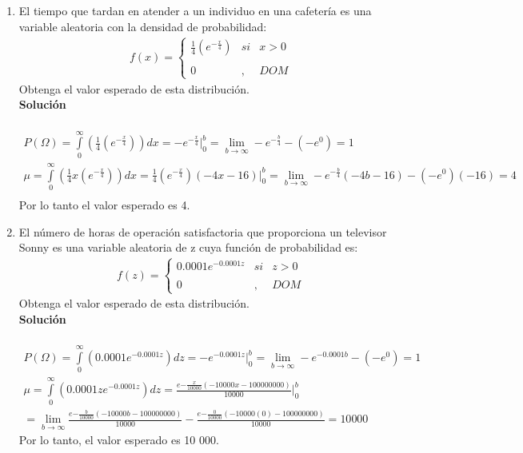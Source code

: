 \begin{enumerate}
    \item El tiempo que tardan en atender a un individuo en una cafetería es una variable aleatoria con la densidad de probabilidad: \\
    \begin{align*}
    f(x)= \left\{ \begin{array}{lcc}
    \frac{1}{4}(e^{-\frac{x}{4}}) &   si  & x > 0 \\
    \\ 0 &  ,  & DOM
    \end{array}
    \right.
    \end{align*}
    Obtenga el valor esperado de esta distribución.
    \\\textbf{Solución}
    \\ \\
    \begin{gather*}
    P(\Omega) = \int \limits_{0}^\infty (\frac{1}{4}(e^{-\frac{x}{4}})) dx = -e^{-\frac{x}{4}} \bigg\vert_{0}^{b} = \lim \limits_{b \rightarrow \infty} -e^{-\frac{b}{4}} - (-e^{0}) = 1 \\
    \mu = \int \limits_{0}^\infty (\frac{1}{4}x(e^{-\frac{x}{4}})) dx = \frac{1}{4}(e^{-\frac{x}{4}})(-4x-16) \bigg\vert_{0}^b = \lim \limits_{b \rightarrow \infty} -e^{-\frac{b}{4}}(-4b -16) - (-e^{0})(-16) = 4 \\
    \end{gather*}
    Por lo tanto el valor esperado es 4. \\
    
    \item El número de horas de operación satisfactoria que proporciona un televisor Sonny es una variable aleatoria de z cuya función de probabilidad es: \\
    \begin{align*}
    f(z)= \left\{ \begin{array}{lcc}
    0.0001e^{-0.0001z} &   si  & z > 0 \\
    \\ 0 &  ,  & DOM
    \end{array}
    \right.
    \end{align*}
    Obtenga el valor esperado de esta distribución.
    \\\textbf{Solución}
    \\ \\
    \begin{gather*}
    P(\Omega) = \int \limits_{0}^{\infty} (0.0001e^{-0.0001z}) dz = -e^{-0.0001z} \bigg\vert_{0}^{b} = \lim \limits_{b \rightarrow \infty} -e^{-0.0001b} - (-e^{0}) = 1 \\
    \mu = \int \limits_{0}^{\infty} (0.0001ze^{-0.0001z}) dz = \frac{e{-\frac{x}{10 000}}(-10 000x - 100 000 000)}{10 000} \bigg\vert_{0}^b \\
    = \lim \limits_{b \rightarrow \infty} \frac{e{-\frac{b}{10 000}}(-10 000b - 100 000 000)}{10 000} - \frac{e{-\frac{0}{10 000}}(-10 000(0) - 100 000 000)}{10 000} = 10 000
    \end{gather*}
    Por lo tanto, el valor esperado es 10 000.
\end{enumerate}